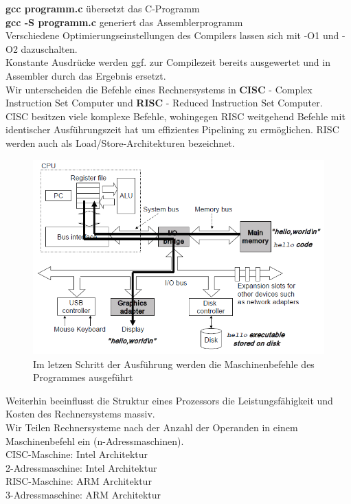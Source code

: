 \documentclass[a4paper,12pt,leqno]{article}
\begin{document}
\textbf{gcc programm.c} übersetzt das C-Programm\\
\textbf{gcc -S programm.c} generiert das Assemblerprogramm\\

Verschiedene Optimierungseinstellungen des Compilers lassen sich mit -O1 und -O2 dazuschalten.\\
Konstante Ausdrücke werden ggf. zur Compilezeit bereits ausgewertet und in Assembler durch das Ergebnis ersetzt.\\
Wir unterscheiden die Befehle eines Rechnersystems in \textbf{CISC} - Complex Instruction Set Computer und \textbf{RISC} - Reduced Instruction Set Computer.\\
CISC besitzen viele komplexe Befehle, wohingegen RISC weitgehend Befehle mit identischer Ausführungszeit hat um effizientes Pipelining zu ermöglichen. RISC werden auch als Load/Store-Architekturen bezeichnet.\\

\begin{figure}[h!]
\centering
\includegraphics[scale=0.6]{Grafiken/Ausfuehrung-eines-Programmes.png}
\caption{Im letzen Schritt der Ausführung werden die Maschinenbefehle des Programmes ausgeführt}
\end{figure}

Weiterhin beeinflusst die Struktur eines Prozessors die Leistungsfähigkeit und Kosten des Rechnersystems massiv.\\
Wir Teilen Rechnersysteme nach der Anzahl der Operanden in einem Maschinenbefehl ein (n-Adressmaschinen).\\

CISC-Maschine: Intel Architektur\\
2-Adressmaschine: Intel Architektur\\
RISC-Maschine: ARM Architektur\\
3-Adressmaschine: ARM Architektur\\
\end{document}

